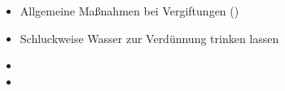 \label{m:saeuren-laugen}
\begin{itemize}
  \item Allgemeine Maßnahmen bei Vergiftungen
  ()
  \item Schluckweise Wasser zur Verdünnung trinken lassen
  \item {}
  \item {}
\end{itemize}